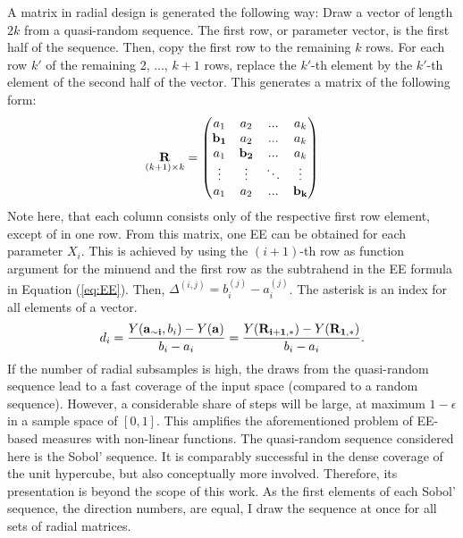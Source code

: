 \documentclass[a4paper,12pt]{article}
\begin{document}
\noindent
A matrix in radial design is generated the following way: Draw a vector of length $2k$ from a quasi-random sequence. The first row, or parameter vector, is the first half of the sequence. Then, copy the first row to the remaining $k$ rows. For each row $k'$ of the remaining 2, ..., $k+1$ rows, replace the $k'$-th element by the $k'$-th element of the second half of the vector. This generates a matrix of the following form:
\begin{align}
\underset{(k+1)\times k}{\bold{R}} =
\begin{pmatrix}
a_1 & a_2 & ... & a_k \\
\bold{b_1} & a_2 & ... & a_k \\
a_1 & \bold{b_2} & ... & a_k \\
\vdots & \vdots & 	\ddots & \vdots\\
a_1 & a_2 & ... & \bold{b_k}
\end{pmatrix}
\end{align}
\noindent
Note here, that each column consists only of the respective first row element, except of in one row.
From this matrix, one EE can be obtained for each parameter $X_i$. This is achieved by using the $(i+1)$-th row as function argument for the minuend and the first row as the subtrahend in the EE formula in Equation (\ref{eq:EE}). Then, $\Delta^{(i,j)} = b_i^{(j)} - a_i^{(j)}$. The asterisk is an index for all elements of a vector.
\begin{align} \label{eq:rad}
d_i =  \frac{Y(\bold{a_{\sim i}}, b_i) - Y(\bold{a})}{b_i - a_i} = \frac{Y(\bold{R_{i+1,*}}) -  Y(\bold{R_{1,*}})}{b_i - a_i}.
\end{align}
If the number of radial subsamples is high, the draws from the quasi-random sequence lead to a fast coverage of the input space (compared to a random sequence). However, a considerable share of steps will be large, at maximum $1-\epsilon$ in a sample space of $[0,1]$. This amplifies the aforementioned problem of EE-based measures with non-linear functions. The quasi-random sequence considered here is the Sobol' sequence. It is comparably successful in the dense coverage of the unit hypercube, but also conceptually more involved. Therefore, its presentation is beyond the scope of this work. As the first elements of each Sobol' sequence, the direction numbers, are equal, I draw the sequence at once for all sets of radial matrices.\\
\end{document}
